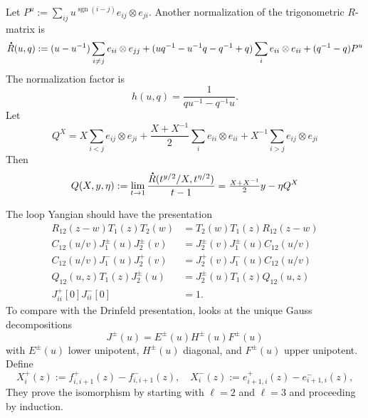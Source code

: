 \documentclass[11pt]{report}
\newcommand*{\dt}[1]{%
  \accentset{\mbox{\large\bfseries .}}{#1}}
\theoremstyle{definition}
\theoremstyle{remark}
\theoremstyle{remark}
\begin{document}
Let $P^u := \sum_{ij} u^{\operatorname{sgn}(i-j)} e_{ij} \otimes e_{ji}$. Another normalization of the trigonometric $R$-matrix is
\begin{equation*}
\dt R(u,q) := (u-u^{-1}) \sum_{i \neq j} e_{ii} \otimes e_{jj} + (uq^{-1}-u^{-1}q-q^{-1}+q) \sum_i e_{ii} \otimes e_{ii} + (q^{-1}-q) P^u
\end{equation*}
The normalization factor is
\begin{equation*}
h(u,q) = \frac{1}{qu^{-1}-q^{-1}u}.
\end{equation*}
Let
\begin{equation*}
Q^X = X \sum_{i < j} e_{ij} \otimes e_{ji} + \frac{X+X^{-1}}{2} \sum_i e_{ii} \otimes e_{ii} + X^{-1} \sum_{i > j} e_{ij} \otimes e_{ji}
\end{equation*}
Then
\begin{equation*}
Q(X,y,\eta) := \lim_{t \to 1} \frac{\dt R(t^{y/2}/X,t^{\eta/2})}{t-1} = \tfrac{X+X^{-1}}{2} y - \eta Q^X
\end{equation*}

The loop Yangian should have the presentation
\begin{align*}
R_{12}(z-w) T_1(z) T_2(w) &= T_2(w) T_1(z) R_{12}(z-w) \\
C_{12}(u/v) J_1^\pm(u) J_2^\pm(v) &= J_2^\pm(v) J_1^\pm(u) C_{12}(u/v) \\
C_{12}(u/v) J_1^-(u) J_2^+(v) &= J_2^+(v) J_1^-(u) C_{12}(u/v) \\
Q_{12}(u,z) T_1(z) J_2^\pm(u) &= J_2^\pm(u) T_1(z) Q_{12}(u,z) \\
J_{ii}^+[0] J_{ii}^-[0] &= 1.
\end{align*}
To compare with the Drinfeld presentation, \cite{article:ding:1993} looks at the unique Gauss decompositions
\begin{equation*}
J^\pm(u) = E^\pm(u) H^\pm(u) F^\pm(u)
\end{equation*}
with $E^\pm(u)$ lower unipotent, $H^\pm(u)$ diagonal, and $F^\pm(u)$ upper unipotent. Define
\begin{equation*}
X_i^+(z) := f_{i,i+1}^+(z)-f_{i,i+1}^-(z), \quad X_i^-(z) := e_{i+1,i}^+(z) - e_{i+1,i}^-(z),
\end{equation*}
They prove the isomorphism by starting with $\ell=2$ and $\ell=3$ and proceeding by induction.
\end{document}
